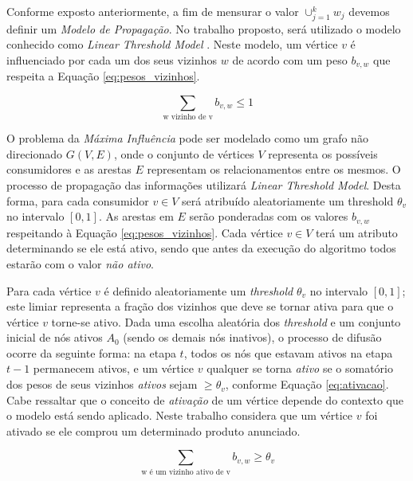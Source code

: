 \documentclass[12pt]{article}
\begin{document}
Conforme exposto anteriormente, a fim de mensurar o valor $\cup_{j=1}^{k} w_{j}$ devemos definir um  \textit{Modelo de Propagação}. No trabalho proposto, será utilizado o modelo conhecido como \textit{Linear Threshold Model} \cite{granovetter1978threshold, schelling2006micromotives}{}. Neste modelo, um vértice $v$ é influenciado por cada um dos seus vizinhos $w$ de acordo com um peso $b_{v,w}$ que respeita a Equação \ref{eq:pesos_vizinhos}{}.

\begin{equation} \label{eq:pesos_vizinhos}
\sum\limits_{\textrm{w vizinho de v}}{b_{v,w} \leq 1}
\end{equation}

O problema da \textit{Máxima Influência} pode ser modelado como um grafo não direcionado $G(V,E)${}, onde o conjunto de vértices $V$ representa os possíveis consumidores e as arestas $E$ representam os relacionamentos entre os mesmos. O processo de propagação das informações utilizará \textit{Linear Threshold Model}. Desta forma, para cada consumidor $v \in V$ será atribuído aleatoriamente um threshold $\theta_v$ no intervalo $[0, 1]$. As arestas em $E$ serão ponderadas com os valores $b_{v,w}$ respeitando à Equação \ref{eq:pesos_vizinhos}. Cada vértice $v \in V$ terá um atributo determinando se ele está ativo, sendo que antes da execução do algoritmo todos estarão com o valor \textit{não ativo}{}.

Para cada vértice $v$ é definido aleatoriamente um \textit{threshold} $\theta_v$ no intervalo $[0, 1]$; este limiar representa a fração dos vizinhos que deve se tornar ativa para que o vértice $v$ torne-se ativo. Dada uma escolha aleatória dos \textit{threshold} e um conjunto inicial de nós ativos $A_{0}$ (sendo os demais nós inativos), o processo de difusão ocorre da seguinte forma: na etapa $t$, todos os nós que estavam ativos na etapa $t-1$ permanecem ativos, e um vértice $v$ qualquer se torna \textit{ativo} se o somatório dos pesos de seus vizinhos \textit{ativos} sejam $\geq \theta_v$, conforme Equação \ref{eq:ativacao}{}. Cabe ressaltar que o conceito de \textit{ativação} de um vértice depende do contexto que o modelo está sendo aplicado. Neste trabalho considera que um vértice $v$ foi ativado se ele comprou um determinado produto anunciado.

\begin{equation} \label{eq:ativacao}
\sum\limits_{\textrm{w é um vizinho ativo de v}}{b_{v,w} \geq \theta_v}
\end{equation}
\end{document}
